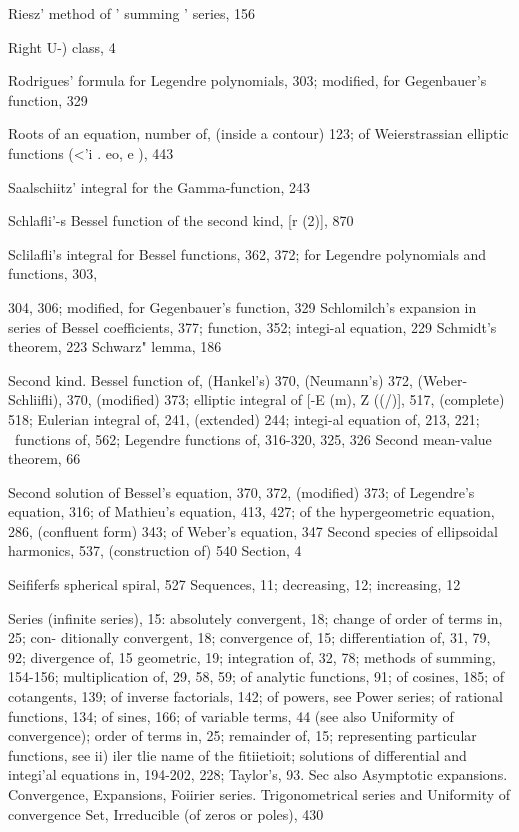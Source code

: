 Riesz' method of ' summing ' series, 156

Right  U-) class, 4

Rodrigues' formula for Legendre polynomials, 303; modified, for Gegenbauer's function, 329

Roots of an equation, number of, (inside a contour) 123; of Weierstrassian elliptic
functions (<'i . eo, e ), 443

Saalschiitz' integral for the Gamma-function, 243

Schlafli'-s Bessel function of the second kind, [r  (2)], 870

Sclilafli's integral for Bessel functions, 362, 372; for Legendre polynomials and functions, 303,

304, 306; modified, for Gegenbauer's function, 329
Schlomilch's expansion in series of Bessel coefficients, 377; function, 352; integi-al equation, 229
Schmidt's theorem, 223
Schwarz" lemma, 186

Second kind. Bessel function of, (Hankel's) 370, (Neumann's) 372, (Weber-Schliifli), 370,
(modified) 373; elliptic integral of [-E (m), Z ((/)], 517, (complete) 518; Eulerian integral of,
241, (extended) 244; integi-al equation of, 213, 221; \Lame\ functions of, 562; Legendre
functions of, 316-320, 325, 326
Second mean-value theorem, 66

Second solution of Bessel's equation, 370, 372, (modified) 373; of Legendre's equation, 316; of
Mathieu's equation, 413, 427; of the hypergeometric equation, 286, (confluent form) 343; of
Weber's equation, 347
Second species of ellipsoidal harmonics, 537, (construction of) 540
Section, 4

Seififerfs spherical spiral, 527
Sequences, 11; decreasing, 12; increasing, 12

Series (infinite series), 15: absolutely convergent, 18; change of order of terms in, 25; con-
ditionally convergent, 18; convergence of, 15; differentiation of, 31, 79, 92; divergence of,
15  geometric, 19; integration of, 32, 78; methods of summing, 154-156; multiplication
of, 29, 58, 59; of analytic functions, 91; of cosines, 185; of cotangents, 139; of inverse
factorials, 142; of powers, see Power series; of rational functions, 134; of sines, 166; of
variable terms, 44 (see also Uniformity of convergence); order of terms in, 25; remainder of,
15; representing particular functions, see ii) iler tlie name of the fitiietioit; solutions of
differential and integi'al equations in, 194-202, 228; Taylor's, 93. Sec also Asymptotic
expansions. Convergence, Expansions, Foiirier series. Trigonometrical series and Uniformity
of convergence
Set, Irreducible (of zeros or poles), 430

